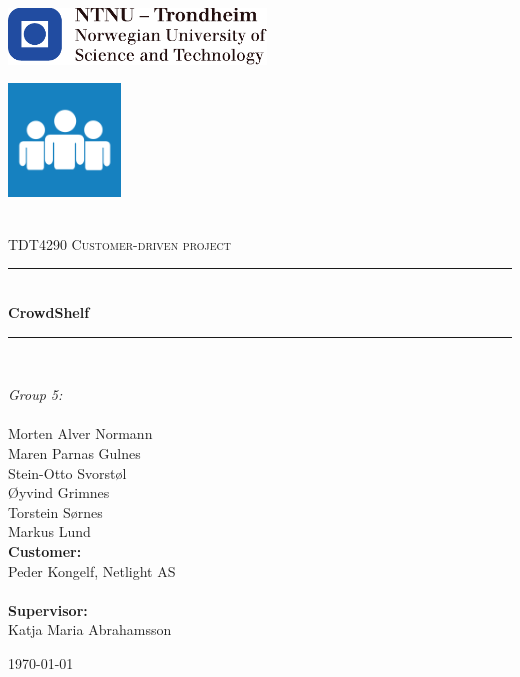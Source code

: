 \begin{titlepage}
\centering

\begin{center}
    \includegraphics[height=1.5cm]{figs/ntnu_logo.pdf}\\[1cm]
\end{center}

\begin{center}
    \includegraphics[height=3cm]{figs/IKON_1024.png}\\[1cm]
\end{center}

\begin{center}

\newcommand{\myauthor}{Morten Alver Normann \\ Maren Parnas Gulnes \\ Stein-Otto Svorstøl \\ Øyvind Grimnes \\ Torstein Sørnes \\ Markus Lund} 
\newcommand{\mytitle}{CrowdShelf}
\newcommand{\mygroupnumber}{5}

~\\[1.5cm]

\textsc{\Large TDT4290 Customer-driven project }\\[0.5cm]

\hrule ~\\[0.2cm]
{\huge \bfseries \mytitle}\\[0.5cm]		%
\hrule ~\\[1.5cm]



\begin{minipage}{0.4\textwidth}
    \centering
	\large
		\emph{Group \mygroupnumber:}\\~\\
		\myauthor\\
		\vspace{2.5cm}
		\vspace{1.5cm}
		\textbf{Customer:} \\ Peder Kongelf, Netlight AS\\~\\
		\textbf{Supervisor:} \\ Katja Maria Abrahamsson 
\end{minipage}

\vfill

{\large \today}

\end{center}
\end{titlepage}


\thispagestyle{empty}